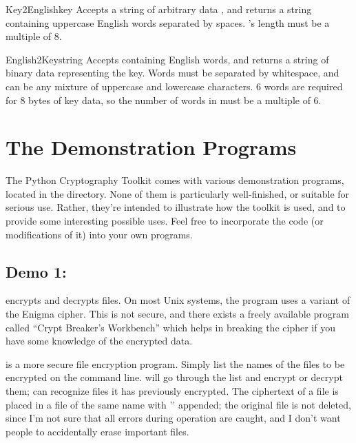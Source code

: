 \documentclass{howto}
\begin{document}
\begin{funcdesc}{Key2English}{key}
Accepts a string of arbitrary data , and returns a string
containing uppercase English words separated by spaces.  's
length must be a multiple of 8.
\end{funcdesc}

\begin{funcdesc}{English2Key}{string}
Accepts  containing English words, and returns a string of
binary data representing the key.  Words must be separated by
whitespace, and can be any mixture of uppercase and lowercase
characters.  6 words are required for 8 bytes of key data, so
the number of words in  must be a multiple of 6.
\end{funcdesc}

\section{The Demonstration Programs}

The Python Cryptography Toolkit comes with various demonstration
programs, located in the  directory.  None of them is
particularly well-finished, or suitable for serious use.  Rather,
they're intended to illustrate how the toolkit is used, and to provide
some interesting possible uses.  Feel free to incorporate the code (or
modifications of it) into your own programs.

\subsection{Demo 1: }

 encrypts and decrypts files.  On most Unix systems, the
 program uses a variant of the Enigma cipher.  This is not
secure, and there exists a freely available program called ``Crypt
Breaker's Workbench'' which helps in breaking the cipher if you have
some knowledge of the encrypted data.

 is a more secure file encryption program.  Simply list
the names of the files to be encrypted on the command line.
 will go through the list and encrypt or decrypt them;
 can recognize files it has previously encrypted.  The
ciphertext of a file is placed in a file of the same name with
'' appended; the original file is not deleted, since I'm
not sure that all errors during operation are caught, and I don't want
people to accidentally erase important files.
\end{document}
